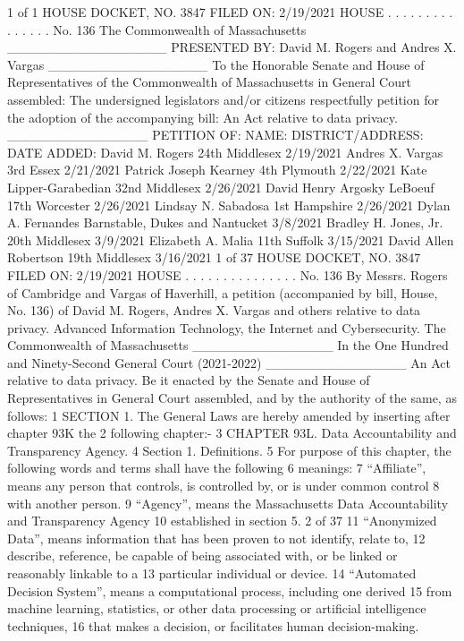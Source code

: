 1 of 1
HOUSE DOCKET, NO. 3847 FILED ON: 2/19/2021
HOUSE . . . . . . . . . . . . . . . No. 136
The Commonwealth of Massachusetts
_________________
PRESENTED BY:
David M. Rogers and Andres X. Vargas
_________________
To the Honorable Senate and House of Representatives of the Commonwealth of Massachusetts in General
Court assembled:
The undersigned legislators and/or citizens respectfully petition for the adoption of the accompanying bill:
An Act relative to data privacy.
_______________
PETITION OF:
NAME: DISTRICT/ADDRESS: DATE ADDED:
David M. Rogers 24th Middlesex 2/19/2021
Andres X. Vargas 3rd Essex 2/21/2021
Patrick Joseph Kearney 4th Plymouth 2/22/2021
Kate Lipper-Garabedian 32nd Middlesex 2/26/2021
David Henry Argosky LeBoeuf 17th Worcester 2/26/2021
Lindsay N. Sabadosa 1st Hampshire 2/26/2021
Dylan A. Fernandes Barnstable, Dukes and Nantucket 3/8/2021
Bradley H. Jones, Jr. 20th Middlesex 3/9/2021
Elizabeth A. Malia 11th Suffolk 3/15/2021
David Allen Robertson 19th Middlesex 3/16/2021
1 of 37
HOUSE DOCKET, NO. 3847 FILED ON: 2/19/2021
HOUSE . . . . . . . . . . . . . . . No. 136
By Messrs. Rogers of Cambridge and Vargas of Haverhill, a petition (accompanied by bill,
House, No. 136) of David M. Rogers, Andres X. Vargas and others relative to data privacy.
Advanced Information Technology, the Internet and Cybersecurity.
The Commonwealth of Massachusetts
_______________
In the One Hundred and Ninety-Second General Court
(2021-2022)
_______________
An Act relative to data privacy.
Be it enacted by the Senate and House of Representatives in General Court assembled, and by the authority
of the same, as follows:
1 SECTION 1. The General Laws are hereby amended by inserting after chapter 93K the
2 following chapter:-
3 CHAPTER 93L. Data Accountability and Transparency Agency.
4 Section 1. Definitions.
5 For purpose of this chapter, the following words and terms shall have the following
6 meanings:
7 “Affiliate”, means any person that controls, is controlled by, or is under common control
8 with another person.
9 “Agency”, means the Massachusetts Data Accountability and Transparency Agency
10 established in section 5.
2 of 37
11 “Anonymized Data”, means information that has been proven to not identify, relate to,
12 describe, reference, be capable of being associated with, or be linked or reasonably linkable to a
13 particular individual or device.
14 “Automated Decision System”, means a computational process, including one derived
15 from machine learning, statistics, or other data processing or artificial intelligence techniques,
16 that makes a decision, or facilitates human decision-making.
